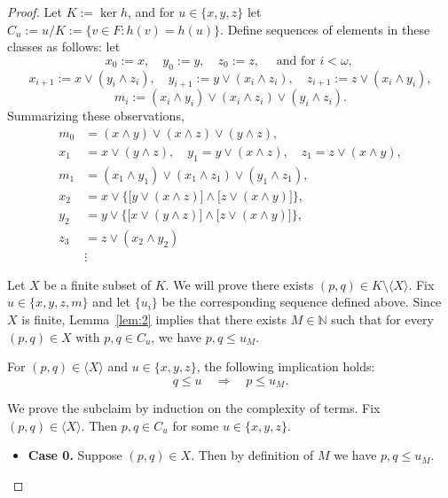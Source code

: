 \begin{proof}
Let $K := \operatorname{ker} h$, and for $u \in \{x, y, z\}$ let $C_u := u/K := \{v \in F : h(v) = h(u)\}$.
Define sequences of elements in these classes as follows:
let 
\[x_0 := x, \quad y_0 := y, \quad z_0 := z, \quad \text{ and for $i< \omega$, }\]
\[
x_{i+1} := x\vee (y_i \wedge z_i), \quad y_{i+1} := y\vee (x_i \wedge z_i), \quad z_{i+1} := z\vee (x_i \wedge y_i),
\]
\[
m_i := (x_i \wedge y_i) \vee (x_i \wedge z_i)\vee (y_i \wedge z_i).
\]
Summarizing these observations,
\begin{align*}
m_0 &= (x\wedge y) \vee (x\wedge z)\vee (y\wedge z),\\
x_1 &= x \vee (y \wedge z), \quad y_1 = y \vee (x \wedge z),  \quad z_1 = z \vee (x \wedge y),\\  
m_1 &= 
 (x_1 \wedge y_1) \vee (x_1 \wedge z_1)\vee (y_1 \wedge z_1),\\
x_2 &= x \vee \bigl\{\bigl[y \vee (x \wedge z)\bigr] \wedge \bigl[z \vee (x \wedge y)\bigr]\bigr\},\\  
y_2 &= y \vee \bigl\{\bigl[x \vee (y \wedge z)\bigr] \wedge \bigl[z \vee (x \wedge y)\bigr]\bigr\},\\  
z_3 &= z \vee (x_2 \wedge y_2)\\ 
& \vdots
\end{align*}

Let $X$ be a finite subset of $K$.  We will prove there exists $(p,q) \in K \setminus \langle X \rangle$.  
Fix $u\in \{x, y, z, m\}$ and let $\{u_i\}$ be the corresponding sequence defined above. 
Since $X$ is finite, Lemma~\ref{lem:2} implies that there exists 
$M \in \mathbb{N}$ such that for every $(p, q) \in X$ with $p, q \in C_u$, we have 
$p, q \leqslant u_M$.

\begin{subclaim}\label{claim:2.1}
   For $(p,q) \in \langle X \rangle$ and $u \in \{x, y, z\}$, the following implication holds:
\begin{equation}
  \label{eq:star}
q \leqslant u \quad \Longrightarrow \quad p\leqslant u_M.
\end{equation}
\end{subclaim}
We prove the subclaim by induction on the complexity of terms.
Fix $(p,q) \in \langle X \rangle$. Then $p, q \in C_u$ for some $u\in \{x, y, z\}$.
\begin{itemize}
\item {\bf Case 0.} Suppose $(p, q) \in X$. Then by definition of $M$ we have $p, q \leqslant u_M$.


\end{itemize}
\end{proof}
